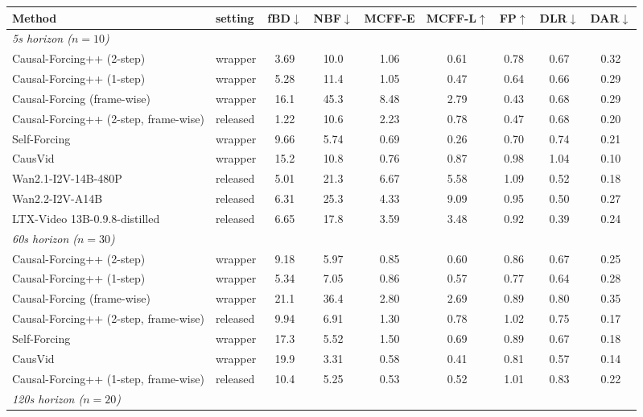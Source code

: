 \begin{table}[!tb]
\centering
\small
\setlength{\tabcolsep}{4pt}
\begin{tabular}{llccccccc}
\toprule
Method & setting & fBD$\downarrow$ & NBF$\downarrow$ & MCFF-E & MCFF-L$\uparrow$ & FP$\uparrow$ & DLR$\downarrow$ & DAR$\downarrow$ \\
\midrule
\multicolumn{9}{l}{\textit{5s horizon  ($n=10$)}} \\
Causal-Forcing++ (2-step) & wrapper & 3.69 & 10.0 & 1.06 & 0.61 & 0.78 & 0.67 & 0.32 \\
Causal-Forcing++ (1-step) & wrapper & 5.28 & 11.4 & 1.05 & 0.47 & 0.64 & 0.66 & 0.29 \\
Causal-Forcing (frame-wise) & wrapper & 16.1 & 45.3 & 8.48 & 2.79 & 0.43 & 0.68 & 0.29 \\
Causal-Forcing++ (2-step, frame-wise) & released & 1.22 & 10.6 & 2.23 & 0.78 & 0.47 & 0.68 & 0.20 \\
Self-Forcing & wrapper & 9.66 & 5.74 & 0.69 & 0.26 & 0.70 & 0.74 & 0.21 \\
CausVid & wrapper & 15.2 & 10.8 & 0.76 & 0.87 & 0.98 & 1.04 & 0.10 \\
Wan2.1-I2V-14B-480P & released & 5.01 & 21.3 & 6.67 & 5.58 & 1.09 & 0.52 & 0.18 \\
Wan2.2-I2V-A14B & released & 6.31 & 25.3 & 4.33 & 9.09 & 0.95 & 0.50 & 0.27 \\
LTX-Video 13B-0.9.8-distilled & released & 6.65 & 17.8 & 3.59 & 3.48 & 0.92 & 0.39 & 0.24 \\
\midrule
\multicolumn{9}{l}{\textit{60s horizon  ($n=30$)}} \\
Causal-Forcing++ (2-step) & wrapper & 9.18 & 5.97 & 0.85 & 0.60 & 0.86 & 0.67 & 0.25 \\
Causal-Forcing++ (1-step) & wrapper & 5.34 & 7.05 & 0.86 & 0.57 & 0.77 & 0.64 & 0.28 \\
Causal-Forcing (frame-wise) & wrapper & 21.1 & 36.4 & 2.80 & 2.69 & 0.89 & 0.80 & 0.35 \\
Causal-Forcing++ (2-step, frame-wise) & released & 9.94 & 6.91 & 1.30 & 0.78 & 1.02 & 0.75 & 0.17 \\
Self-Forcing & wrapper & 17.3 & 5.52 & 1.50 & 0.69 & 0.89 & 0.67 & 0.18 \\
CausVid & wrapper & 19.9 & 3.31 & 0.58 & 0.41 & 0.81 & 0.57 & 0.14 \\
Causal-Forcing++ (1-step, frame-wise) & released & 10.4 & 5.25 & 0.53 & 0.52 & 1.01 & 0.83 & 0.22 \\
\midrule
\multicolumn{9}{l}{\textit{120s horizon  ($n=20$)}} \\

\end{tabular}
\end{table}
